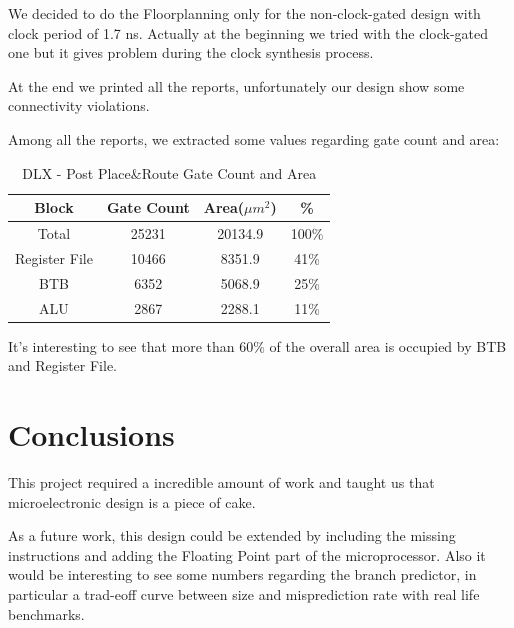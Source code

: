 \documentclass[12pt]{article}
\begin{document}
We decided to do the Floorplanning only for the non-clock-gated design with clock period of 1.7 ns.
Actually at the beginning we tried with the clock-gated one but it gives problem during the clock synthesis process.

At the end we printed all the reports, unfortunately our design show some connectivity violations.

Among all the reports, we extracted some values regarding gate count and area:
\begin{table}
\begin{center}
	\begin{tabular}{ | c | c | c | c |}
		\hline
		\rowcolor{LimeGreen}   Block & Gate Count & Area($\mu m^2$)& \%\\ \hline
		Total & 25231 & 20134.9 & 100\% \\ \hline
		Register File & 10466 & 8351.9 & 41\% \\ \hline
		BTB & 6352 &  5068.9 & 25\% \\ \hline
		ALU & 2867 & 2288.1 & 11\% \\ \hline
	\end{tabular}
	\caption{DLX - Post Place\&Route Gate Count and Area}
	\label{AREA}
\end{center}
\end{table}
It's interesting to see that more than 60\% of the overall area is occupied by BTB and Register File.



\section{Conclusions}\label{Conclusions}
This project required a incredible amount of work and taught us that microelectronic design is a piece of cake.

As a future work, this design could be extended by including the missing instructions and adding the Floating Point part of the microprocessor. 
Also it would be interesting to see some numbers regarding the branch predictor, in particular a trad-eoff curve between size and misprediction rate with real life benchmarks.


\printbibliography
\end{document}
